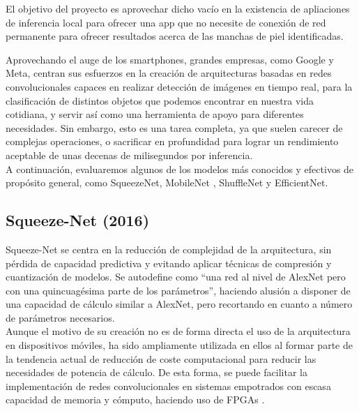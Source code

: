 El objetivo del proyecto es aprovechar dicho vacío en la existencia de apliaciones de inferencia local para ofrecer una app que no necesite de conexión de red permanente para ofrecer resultados acerca de las manchas de piel identificadas.

Aprovechando el auge de los smartphones, grandes empresas, como Google y Meta, centran sus esfuerzos en la creación de arquitecturas basadas en redes convolucionales capaces en realizar detección de imágenes en tiempo real, para la clasificación de distintos objetos que podemos encontrar en nuestra vida cotidiana, y servir así como una herramienta de apoyo para diferentes necesidades. Sin embargo, esto es una tarea completa, ya que suelen carecer de complejas operaciones, o sacrificar en profundidad para lograr un rendimiento aceptable de unas decenas de milisegundos por inferencia.\\

A continuación, evaluaremos algunos de los modelos más conocidos y efectivos de propósito general, como SqueezeNet\cite{iandola2016squeezenet}, MobileNet \cite{howard2017mobilenets,sandler2019mobilenetv2,howard2019searching}, ShuffleNet \cite{zhang2017shufflenet} y  EfficientNet\cite{tan2020efficientnet,eflite}.

\subsection{Squeeze-Net (2016)}

Squeeze-Net\cite{iandola2016squeezenet} se centra en la reducción de complejidad de la arquitectura, sin pérdida de capacidad predictiva y evitando aplicar técnicas de compresión y cuantización\cite{kuzmin2024fp8} de modelos. Se autodefine como ``una red al nivel de AlexNet\cite{NIPS2012_c399862d} pero con una quincuagésima parte de los parámetros'', haciendo alusión a disponer de una capacidad de cálculo similar a AlexNet, pero recortando en cuanto a número de parámetros necesarios.\\

Aunque el motivo de su creación no es de forma directa el uso de la arquitectura en dispositivos móviles, ha sido ampliamente utilizada en ellos al formar parte de la tendencia actual de reducción de coste computacional para reducir las necesidades de potencia de cálculo. De esta forma, se puede facilitar la implementación de redes convolucionales en sistemas empotrados con escasa capacidad de memoria y cómputo, haciendo uso de FPGAs \cite{fpga}.\\


